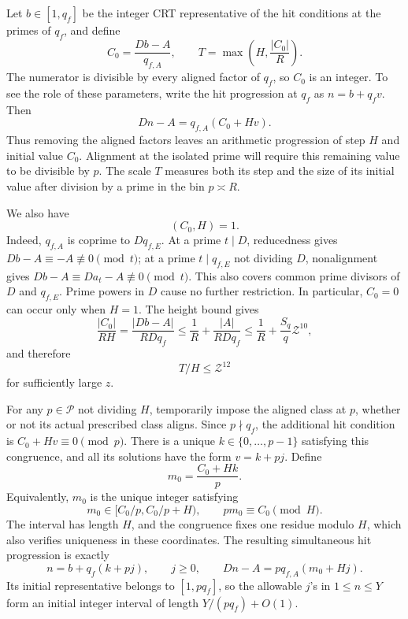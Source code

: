Let \(b\in[1,q_f]\) be the integer CRT representative of the hit
conditions at the primes of \(q_f\), and define
\begin{equation}\label{eq:variance-effective}
 C_0=\frac{Db-A}{q_{f,A}},
 \qquad T=\max\left(H,\frac{|C_0|}{R}\right).
\end{equation}
The numerator is divisible by every aligned factor of \(q_f\), so \(C_0\)
is an integer. To see the role of these parameters, write the hit
progression at \(q_f\) as \(n=b+q_f v\). Then
\[
 Dn-A=q_{f,A}(C_0+Hv).
\]
Thus removing the aligned factors leaves an arithmetic progression of
step \(H\) and initial value \(C_0\). Alignment at the isolated prime
will require this remaining value to be divisible by \(p\).
The scale \(T\) measures both its step and the size of its initial value
after division by a prime in the bin \(p\asymp R\).

We also have
\begin{equation}\label{eq:variance-unit}
 (C_0,H)=1.
\end{equation}
Indeed, \(q_{f,A}\) is coprime to \(Dq_{f,E}\). At a prime \(t\mid D\),
reducedness gives \(Db-A\equiv-A\not\equiv0\pmod t\); at a prime
\(t\mid q_{f,E}\) not dividing \(D\), nonalignment gives
\(Db-A\equiv Da_t-A\not\equiv0\pmod t\).
This also covers common prime divisors of \(D\) and \(q_{f,E}\).
Prime powers in \(D\) cause no further restriction.
In particular, \(C_0=0\) can occur only when \(H=1\).
The height bound gives
\[
 \frac{|C_0|}{RH}
 =\frac{|Db-A|}{RDq_f}
 \le \frac1R+\frac{|A|}{RDq_f}
 \le \frac1R+\frac{S_q}{q}\mathcal Z^{10},
\]
and therefore
\begin{equation}\label{eq:variance-effective-ratio}
 T/H\le\mathcal Z^{12}
\end{equation}
for sufficiently large \(z\).

For any \(p\in\mathcal P\) not dividing \(H\), temporarily impose the
aligned class at \(p\), whether or not its actual prescribed class aligns.
Since \(p\nmid q_f\), the additional hit condition is
\(C_0+Hv\equiv0\pmod p\). There is a unique
\(k\in\{0,\ldots,p-1\}\) satisfying this congruence, and all its
solutions have the form \(v=k+pj\). Define
\[
 m_0=\frac{C_0+Hk}{p}.
\]
Equivalently, \(m_0\) is the unique integer satisfying
\begin{equation}\label{eq:variance-m-coordinate}
 m_0\in[C_0/p,C_0/p+H),
 \qquad pm_0\equiv C_0\pmod H.
\end{equation}
The interval has length \(H\), and the congruence fixes one residue
modulo \(H\), which also verifies uniqueness in these coordinates.
The resulting simultaneous hit progression is exactly
\begin{equation}\label{eq:variance-progression}
 n=b+q_f(k+pj),\qquad j\ge0,
 \qquad
 Dn-A=pq_{f,A}(m_0+Hj).
\end{equation}
Its initial representative belongs to \([1,pq_f]\), so the allowable
\(j\)'s in \(1\le n\le Y\) form an initial integer interval of length
\(Y/(pq_f)+O(1)\).

